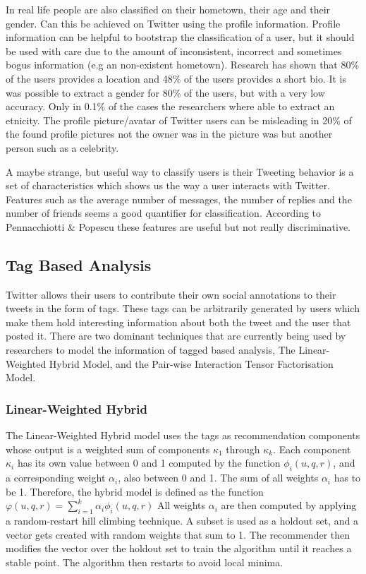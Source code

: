 \documentclass{article}
\begin{document}
In real life people are also classified on their hometown, their age and their gender. Can this be achieved on Twitter using the profile information.  Profile information can be helpful to bootstrap the classification of a user, but it should be used with care due to the amount of inconsistent, incorrect and sometimes bogus information (e.g an non-existent hometown). Research has shown that 80\% of the users provides a location and 48\% of the users provides a short bio. \cite{usermachine} It is was possible to extract a gender for 80\% of the users, but with a very low accuracy. Only in 0.1\% of the cases the researchers where able to extract an etnicity. The profile picture/avatar of Twitter users can be misleading in 20\% of the found profile pictures not the owner was in the picture was but another person such as a celebrity.  \cite{usermachine}

A maybe strange, but useful way to classify users is their   Tweeting behavior is a set of characteristics which shows us the way a user interacts with Twitter. Features such as the average number of messages, the number of replies and the number of friends seems a good quantifier for classification. According to Pennacchiotti \& Popescu these features are useful but not really discriminative. \cite{userclasst} 

\subsection{Tag Based Analysis}

Twitter allows their users to contribute their own social annotations to their tweets in the form of tags. These tags can be arbitrarily generated by users 
which make them hold interesting information about both the tweet and the user that posted it. There are two dominant techniques that are currently being
used by researchers to model the information of tagged based analysis, The Linear-Weighted Hybrid Model, and the Pair-wise Interaction Tensor Factorisation Model\cite{TagBased}.


\subsubsection*{Linear-Weighted Hybrid}

The Linear-Weighted Hybrid model uses the tags as recommendation components whose output is a weighted sum of components $\kappa_1$ through $\kappa_k$. 
Each component $\kappa_i$ has its own value between 0 and 1 computed by the function $\phi_i (u,q,r)$, and a corresponding weight $\alpha_i$, also between
0 and 1. The sum of all weights $\alpha_i$ has to be 1.
Therefore, the hybrid model is defined as the function $\varphi (u, q, r) = \sum\limits_{i = 1}^k \alpha_i \phi_i (u,q,r)$
All weights $\alpha_i$ are then computed by applying a random-restart hill climbing technique. A subset is used as a holdout set, and a vector gets created with random weights that sum to 1. The recommender then modifies the vector over the holdout set to train the algorithm until it reaches a stable point. The algorithm then restarts to avoid local minima.
\end{document}
